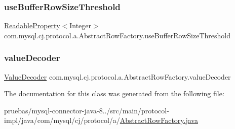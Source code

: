 \subsubsection{\texorpdfstring{use\+Buffer\+Row\+Size\+Threshold}{useBufferRowSizeThreshold}}
{\footnotesize\ttfamily \mbox{\hyperlink{interfacecom_1_1mysql_1_1cj_1_1conf_1_1_readable_property}{Readable\+Property}}$<$Integer$>$ com.\+mysql.\+cj.\+protocol.\+a.\+Abstract\+Row\+Factory.\+use\+Buffer\+Row\+Size\+Threshold\hspace{0.3cm}{\ttfamily [protected]}}

\mbox{\label{classcom_1_1mysql_1_1cj_1_1protocol_1_1a_1_1_abstract_row_factory_a7eaae01dda1379db83fbf4076eab67df}} 
\subsubsection{\texorpdfstring{value\+Decoder}{valueDecoder}}
{\footnotesize\ttfamily \mbox{\hyperlink{interfacecom_1_1mysql_1_1cj_1_1protocol_1_1_value_decoder}{Value\+Decoder}} com.\+mysql.\+cj.\+protocol.\+a.\+Abstract\+Row\+Factory.\+value\+Decoder\hspace{0.3cm}{\ttfamily [protected]}}



The documentation for this class was generated from the following file\+:\begin{DoxyCompactItemize}
\item 
pruebas/mysql-\/connector-\/java-\/8../src/main/protocol-\/impl/java/com/mysql/cj/protocol/a/\mbox{\hyperlink{_abstract_row_factory_8java}{Abstract\+Row\+Factory.\+java}}\end{DoxyCompactItemize}
